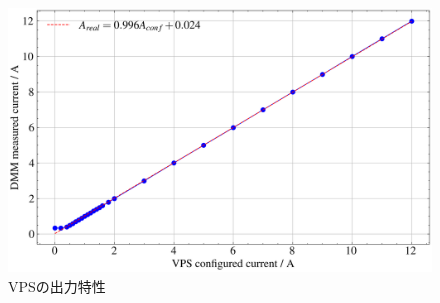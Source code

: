 \begin{figure}[!htb]
	\centering
	\includegraphics[width=0.6\linewidth]{src/figures/consi2/vps-dmm-with-fit.png}
	\caption{VPSの出力特性}\label{fig:vps-dmm-with-fit}
\end{figure}
